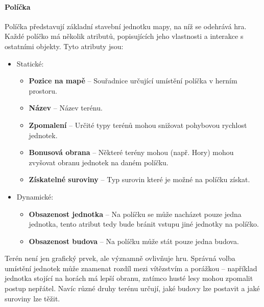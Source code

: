 \paragraph{Políčka}
Políčka představují základní stavební jednotku mapy, na níž se odehrává hra. Každé políčko má několik atributů, popisujících jeho vlastnosti a interakce s ostatními objekty. Tyto atributy jsou:
\begin{itemize}
    \item Statické:
    \begin{itemize}
        \item \textbf{Pozice na mapě} -- Souřadnice určující umístění políčka v herním prostoru.
        \item \textbf{Název} -- Název terénu.
        \item \textbf{Zpomalení} -- Určité typy terénů mohou snižovat pohybovou rychlost jednotek. 
        \item \textbf{Bonusová obrana} -- Některé terény mohou (např. Hory) mohou zvyšovat obranu jednotek na daném políčku.
        \item \textbf{Získatelné suroviny} -- Typ surovin které je možné na políčku získat.
    \end{itemize}
    \item Dynamické:
    \begin{itemize}
        \item \textbf{Obsazenost jednotka} -- Na políčku se může nacházet pouze jedna jednotka, tento atribut tedy bude bránit vstupu jiné jednotky na políčko.
    \item \textbf{Obsazenost budova} -- Na políčku může stát pouze jedna budova.
    \end{itemize}
\end{itemize}

Terén není jen grafický prvek, ale významně ovlivňuje hru. Správná volba umístění jednotek může znamenat rozdíl mezi vítězstvím a porážkou – například jednotka stojící na horách má lepší obranu, zatímco husté lesy mohou zpomalit postup nepřátel. Navíc různé druhy terénu určují, jaké budovy lze postavit a jaké suroviny lze těžit.




